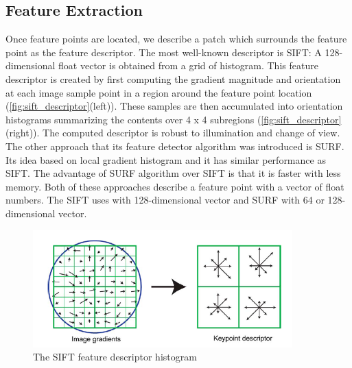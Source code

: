 \subsection{Feature Extraction} \label{subsec:feature_extraction}
Once feature points are located, we describe a patch which surrounds the feature point as the feature descriptor. The most well-known descriptor is SIFT: A 128-dimensional float vector is obtained from a grid of histogram. This feature descriptor is created by first computing the gradient magnitude and orientation at each image sample point in a region around the feature point location (\autoref{fig:sift_descriptor}(left)). These samples are then accumulated into orientation histograms summarizing the contents over 4 x 4 subregions (\autoref{fig:sift_descriptor}(right)). The computed descriptor is robust to illumination and change of view. The other approach that its feature detector algorithm was introduced is SURF. Its idea based on local gradient histogram and it has similar performance as SIFT. The advantage of SURF algorithm over SIFT is that it is faster with less memory. Both of these approaches describe a feature point with a vector of float numbers. The SIFT uses with 128-dimensional vector and SURF with 64 or 128-dimensional vector.\\

\begin{figure}[H]
  \centering
  \includegraphics[width=100mm]{figures/sift_descriptor}
  \caption{The SIFT feature descriptor histogram}\label{fig:sift_descriptor}
\end{figure}

